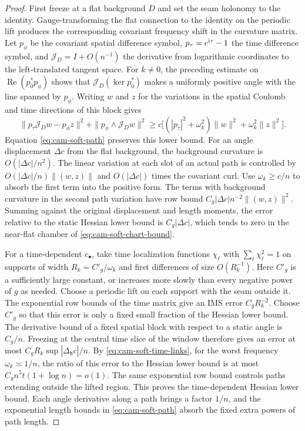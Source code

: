 \documentclass[11pt,a4paper]{article}
\numberwithin{equation}{section}
\newcommand{\hper}{\mathfrak h}
\begin{document}
\begin{proof}
First freeze at a flat background \(D\) and set the seam holonomy to the identity. Gauge-transforming the flat connection to the identity on the periodic lift produces the corresponding covariant frequency shift in the curvature matrix. Let \(p_\phi\) be the covariant spatial difference symbol, \(p_\tau=e^{{\rm i}\tau}-1\) the time difference symbol, and \(\mathcal J_D=I+O(n^{-1})\) the derivative from logarithmic coordinates to the left-translated tangent space. For \(k\ne0\), the preceding estimate on \(\operatorname{Re}(p_0^*p_\phi)\) shows that \(\mathcal J_D(\ker p_0^*)\) makes a uniformly positive angle with the line spanned by \(p_\phi\). Writing \(w\) and \(z\) for the variations in the spatial Coulomb and time directions of this block gives
\[
 \|p_\tau\mathcal J_D w-p_\phi z\|^2+
     \|p_\phi\wedge\mathcal J_D w\|^2
 \ge c\bigl[(|p_\tau|^2+\omega_k^2)\|w\|^2+
                      \omega_k^2\|z\|^2\bigr].
\]
Equation \eqref{eq:cam-soft-path} preserves this lower bound. For an angle displacement \(\Delta c\) from the flat background, the background curvature is \(O(|\Delta c|/n^2)\). The linear variation at each slot of an actual path is controlled by \(O(|\Delta c|/n)\|(w,z)\|\) and \(O(|\Delta c|)\) times the covariant curl. Use \(\omega_k\ge c/n\) to absorb the first term into the positive form. The terms with background curvature in the second path variation have row bound \(C_g|\Delta c|n^{-2}\|(w,z)\|^2\). Summing against the original displacement and length moments, the error relative to the static Hessian lower bound is \(C_g|\Delta c|\), which tends to zero in the near-flat chamber of \eqref{eq:cam-soft-chart-bound}.

For a time-dependent \(c_\bullet\), take time localization functions \(\chi_\ell\) with \(\sum_\ell\chi_\ell^2=1\) on supports of width \(R_k=C'_g/\omega_k\) and first differences of size \(O(R_k^{-1})\). Here \(C'_g\) is a sufficiently large constant, or increases more slowly than every negative power of \(g\) as needed. Choose a periodic lift on each support with the seam outside it. The exponential row bounds of the time matrix give an IMS error \(C_g R_k^{-2}\). Choose \(C'_g\) so that this error is only a fixed small fraction of the Hessian lower bound. The derivative bound of a fixed spatial block with respect to a static angle is \(C_g/n\). Freezing at the central time slice of the window therefore gives an error at most \(C_g R_k \sup|\Delta_\hper  c|/n\). By \eqref{eq:cam-soft-time-links}, for the worst frequency \(\omega_k\asymp1/n\), the ratio of this error to the Hessian lower bound is at most
\(C_g n^5t(1+\log n)=o(1)\). The same exponential row bound controls paths extending outside the lifted region. This proves the time-dependent Hessian lower bound. Each angle derivative along a path brings a factor \(1/n\), and the exponential length bounds in \eqref{eq:cam-soft-path} absorb the fixed extra powers of path length.
\end{proof}
\end{document}
